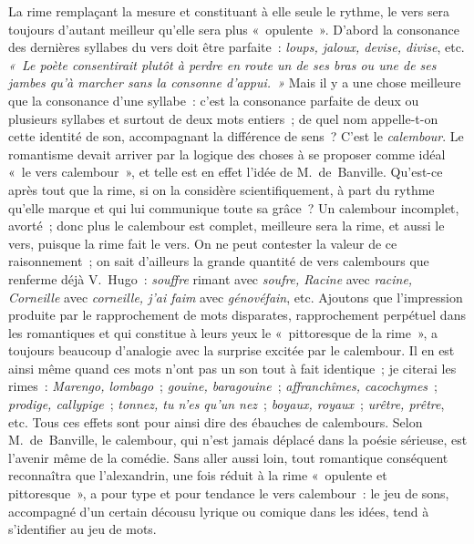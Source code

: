 \documentclass[french,twoside]{book} %
\begin{document}
La rime remplaçant la mesure et constituant à elle seule le rythme, le vers sera toujours d’autant meilleur qu’elle sera plus « opulente ». D’abord la consonance des dernières syllabes du vers doit être parfaite : \emph{loups, jaloux, devise, divise}, etc. \emph{« Le poète consentirait plutôt à perdre en route un de ses bras ou une de ses jambes  qu’à marcher sans la consonne d’appui. »} Mais il y a une chose meilleure que la consonance d’une syllabe : c’est la consonance parfaite de deux ou plusieurs syllabes et surtout de deux mots entiers ; de quel nom appelle-t-on cette identité de son, accompagnant la différence de sens ? C’est le \emph{calembour}. Le romantisme devait arriver par la logique des choses à se proposer comme idéal « le vers calembour », et telle est en effet l’idée de M. de Banville. Qu’est-ce après tout que la rime, si on la considère scientifiquement, à part du rythme qu’elle marque et qui lui communique toute sa grâce ? Un calembour incomplet, avorté ; donc plus le calembour est complet, meilleure sera la rime, et aussi le vers, puisque la rime fait le vers. On ne peut contester la valeur de ce raisonnement ; on sait d’ailleurs la grande quantité de vers calembours que renferme déjà V. Hugo : \emph{souffre} rimant avec \emph{soufre, Racine} avec \emph{racine, Corneille} avec \emph{corneille, j’ai faim} avec \emph{génovéfain}, etc. Ajoutons que l’impression produite par le rapprochement de mots disparates, rapprochement perpétuel dans les romantiques et qui constitue à leurs yeux le « pittoresque de la rime », a toujours beaucoup d’analogie avec la surprise excitée par le calembour. Il en est ainsi même quand ces mots n’ont pas un son tout à fait identique ; je citerai les rimes : \emph{Marengo, lombago} ; \emph{gouine, baragouine} ; \emph{affranchîmes, cacochymes} ; \emph{prodige, callypige} ; \emph{tonnez, tu n’es qu’un nez} ; \emph{boyaux, royaux} ; \emph{urêtre, prêtre}, etc. Tous ces effets sont pour ainsi dire des ébauches de calembours. Selon M. de Banville, le calembour, qui n’est jamais déplacé dans la poésie sérieuse,  est l’avenir même de la comédie. Sans aller aussi loin, tout romantique conséquent reconnaîtra que l’alexandrin, une fois réduit à la rime « opulente et pittoresque », a pour type et pour tendance le vers calembour : le jeu de sons, accompagné d’un certain décousu lyrique ou comique dans les idées, tend à s’identifier au jeu de mots.\par
\end{document}
